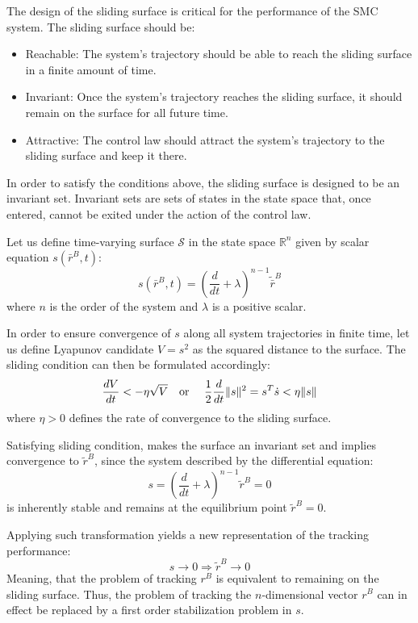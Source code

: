     The design of the sliding surface is critical for the performance of the SMC
    system. The sliding surface should be:
    \begin{itemize}
        \item Reachable: The system's trajectory should be able to reach the sliding
            surface in a finite amount of time.
        \item Invariant: Once the system's trajectory reaches the sliding surface, it
            should remain on the surface for all future time.
        \item Attractive: The control law should attract the system's trajectory to the
            sliding surface and keep it there.
    \end{itemize}

    In order to satisfy the conditions above, the sliding surface is designed to be an invariant set.
    Invariant sets are sets of states in the state space that, once entered, cannot be exited under 
    the action of the control law.

    Let us define time-varying surface $\mathcal{S}$ in the state space $\mathbb{R}^n$
    given by scalar equation $s(\bar{r}^B, t)$:
    $$
        s(\bar{r}^B, t) = (\frac{d}{dt} + \lambda)^{n-1}\tilde{\bar{r}}^B
    $$
    where $n$ is the order of the system and $\lambda$ is a positive scalar.

    In order to ensure convergence of $s$ along all system trajectories in finite time, 
    let us define Lyapunov candidate $V = s^2$ as the squared distance to the surface.
    The sliding condition can then be formulated accordingly:
    $$
    \frac{dV}{dt} < -\eta \sqrt{V} \text{\quad or \quad}
    \frac{1}{2}\frac{d}{dt}\|s\|^2 = s^T\dot{s} < \eta \|s\|
    $$
    where $\eta>0$ defines the rate of convergence to the sliding surface.

    Satisfying sliding condition, makes the surface an invariant set
    and implies convergence to $\tilde{r}^B$, since the system described by 
    the differential equation:
    $$
        s = (\frac{d}{dt} + \lambda)^{n-1}\tilde r^B = 0
    $$
    is inherently stable and remains at the equilibrium point $\tilde r^B = 0$.

    Applying such transformation yields a new representation of the tracking performance:
    $$
        s \rightarrow 0 \Rightarrow \tilde{r}^B \rightarrow 0
    $$
    Meaning, that the problem of tracking $r^B$ is equivalent to remaining on
    the sliding surface. Thus, the problem of tracking the $n$-dimensional vector $r^B$
    can in effect be replaced by a first order stabilization problem in $s$.

